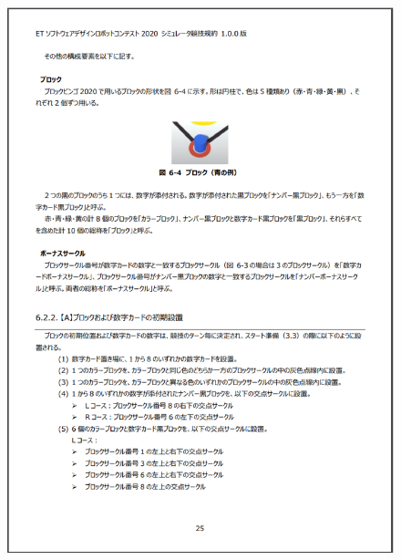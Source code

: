 \documentclass[uplatex, report, a4j, 10pt]{jsbook}
\begin{document}
\begin{figure}[tp]
    \begin{center}
    \includegraphics[width=\hsize]{specification/ET_12.eps}
    \end{center}
\end{figure}
\end{document}
